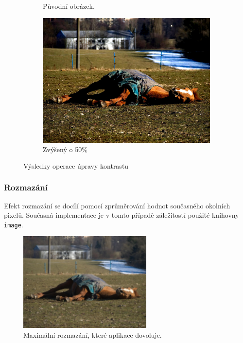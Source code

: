 \documentclass[11pt, a4paper, titlepage]{article}
\begin{document}
\begin{figure}[h]
\begin{subfigure}[t]{0.25\textwidth}
        \caption{Původní obrázek.}
    \end{subfigure}
    \hspace{1cm}
    \begin{subfigure}[t]{0.25\textwidth}
        \vskip 0pt
        \includegraphics[width=1.0\textwidth]{horse_contrast_plus.jpg}
        \caption{Zvýšený o 50\%}
    \end{subfigure}
    \caption{Výsledky operace úpravy kontrastu}
    \label{fig:contrast}
\end{figure}


\subsubsection{Rozmazání}
Efekt rozmazání se docílí pomocí zprůměrování hodnot současného okolních pixelů.
Současná implementace je v tomto případě záležitostí použité knihovny \texttt{image}.
\begin{figure}[h]
    \centering
    \includegraphics[height=5cm]{horse_blur.jpg}
    \caption{Maximální rozmazání, které aplikace dovoluje.}
    \label{fig:blur}
\end{figure}
\end{document}
